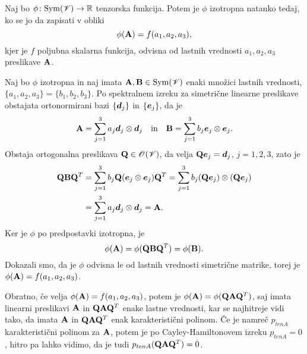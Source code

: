\begin{izrek} \label{i:prinva}
	Naj bo $\phi\colon\mathrm{Sym}(\mathscr V)\to\mathbb R$ tenzorska funkcija.
	Potem je $\phi$ izotropna natanko tedaj, ko se jo da zapisati v obliki
	\[
		\phi(\mathbf A)=f(a_1,a_2,a_3),
	\]
	kjer je $f$ poljubna skalarna funkcija, odvisna od lastnih vrednosti $a_1,a_2,a_3$
	preslikave $\mathbf A$.
\end{izrek}

\proof
	Naj bo $\phi$ izotropna in naj imata $\mathbf A,\mathbf B\in\mathrm{Sym}(\mathscr V)$
	enaki množici lastnih vrednosti, $\{a_1,a_2,a_3\}=\{b_1,b_2,b_3\}$.
	Po spektralnem izreku za simetrične linearne preslikave
	obstajata ortonormirani bazi $\{\boldsymbol d_j\}$ in $\{\boldsymbol e_j\}$, da je
	\[
		\mathbf A=\sum_{j=1}^3 a_j\boldsymbol d_j\otimes\boldsymbol d_j\quad\textrm{in}\quad
		\mathbf B=\sum_{j=1}^3 b_j\boldsymbol e_j\otimes\boldsymbol e_j.
	\]
	Obstaja ortogonalna preslikava $\mathbf Q\in\mathscr{O}(\mathscr V)$,
	da velja $\mathbf Q\boldsymbol e_j=\boldsymbol d_j$, $j=1,2,3$, zato je
	\begin{align*}
		\mathbf Q\mathbf B\mathbf Q^T&=\sum_{j=1}^3 b_j\mathbf Q(\boldsymbol e_j\otimes\boldsymbol e_j)\mathbf Q^T
		=\sum_{j=1}^3 b_j(\mathbf Q\boldsymbol e_j)\otimes(\mathbf Q\boldsymbol e_j) \\
		&=\sum_{j=1}^3 a_j\boldsymbol d_j\otimes\boldsymbol d_j=\mathbf A.
	\end{align*}
	Ker je $\phi$ po predpostavki izotropna, je
	\[
		\phi(\mathbf A)=\phi(\mathbf Q\mathbf B\mathbf Q^T)=\phi(\mathbf B).
	\]
	Dokazali smo, da je $\phi$ odvisna le od lastnih vrednosti simetrične matrike,
	torej je $\phi(\mathbf A)=f(a_1,a_2,a_3)$.
	
	Obratno, če velja $\phi(\mathbf A)=f(a_1,a_2,a_3)$, potem je $\phi(\mathbf A)=\phi(\mathbf Q\mathbf A\mathbf Q^T)$,
	saj imata linearni preslikavi $\mathbf A$ in $\mathbf Q\mathbf A\mathbf Q^T$ enake lastne vrednosti,
	kar se najhitreje vidi tako, da imata $\mathbf A$ in $\mathbf Q\mathbf A\mathbf Q^T$ enak karakteristični polinom.
	Če je namreč $p_{ten{A}}$ karakteristični polinom za $\mathbf A$, potem je po Cayley-Hamiltonovem izreku
	$p_{ten{A}}=0$, hitro pa lahko vidimo, da je tudi $p_{ten{A}}(\mathbf Q\mathbf A\mathbf Q^T)=0$.
\endproof

